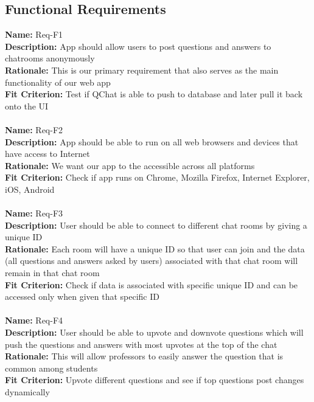 \documentclass[12pt, titlepage]{article}
\begin{document}
\subsection{Functional Requirements}
\textbf{Name:} Req-F1
\\
\textbf{Description:} App should allow users to post questions and answers to chatrooms anonymously 
\\
\textbf{Rationale:} This is our primary requirement that also serves as the main functionality of our web app 
\\
\textbf{Fit Criterion:} Test if QChat is able to push to database and later pull it back onto the UI 
\\
\\
\textbf{Name:} Req-F2
\\
\textbf{Description:} App should be able to run on all web browsers and devices that have access to Internet 
\\
\textbf{Rationale:} We want our app to the accessible across all platforms 
\\
\textbf{Fit Criterion:} Check if app runs on Chrome, Mozilla Firefox, Internet Explorer, iOS, Android 
\\
\\

\textbf{Name:} Req-F3
\\
\textbf{Description:} User should be able to connect to different chat rooms by giving a unique ID  
\\
\textbf{Rationale:} Each room will have a unique ID so that user can join and the data (all questions and answers asked by users)  associated with that chat room will remain in that chat room 
\\
\textbf{Fit Criterion:} Check if data is associated with specific unique ID and can be accessed only when given that specific ID 
\\
\\
\textbf{Name:} Req-F4
\\
\textbf{Description:} User should be able to upvote and downvote questions which will push the questions and answers with most upvotes at the top of the chat
\\
\textbf{Rationale:} This will allow professors to easily answer the question that is common among students 
\\
\textbf{Fit Criterion:} Upvote different questions and see if top questions post changes dynamically 
\end{document}
